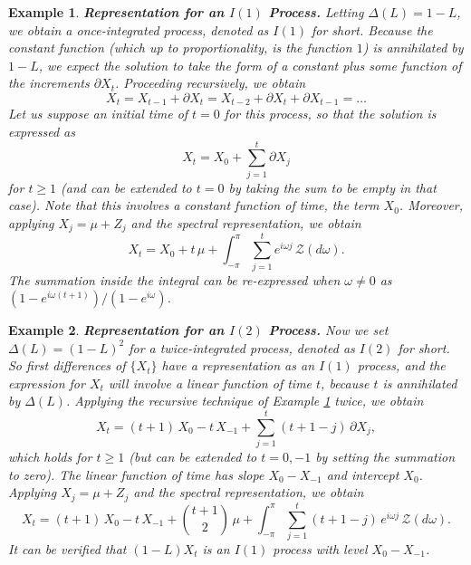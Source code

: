 \documentclass[a4paper]{book}
\newtheorem{Example}{Example}
\begin{document}
 \begin{Example} {\bf Representation for an $I(1)$ Process.}  \rm
 \label{exam:I1-rep}
    Letting $\Delta (L)= 1-L$, we obtain a once-integrated process,
  denoted as $I(1)$ for short.    
  Because  the constant function (which up to proportionality, is the function $1$)
  is annihilated by $1-L$, we expect the solution to take the form
   of a constant plus some function of the increments $\partial X_t$.
   Proceeding recursively, we obtain
\[
  X_t =    X_{t-1} + \partial X_t = X_{t-2} + \partial X_t + \partial X_{t-1} = \ldots
\]
    Let us suppose an initial time of $t=0$ for this process, so that the
      solution is expressed as 
\[
 X_t = X_0 + \sum_{j=1}^t \partial X_j
\]
    for $t \geq 1$ (and can be extended to $t=0$ by taking the sum to be empty in that case).
  Note that this involves a constant function of time,
  the term $X_0$.  Moreover, applying $X_j = \mu + Z_j$ and the spectral representation,
  we obtain
\begin{equation*}
 X_t = X_0 + t \, \mu +   \int_{-\pi}^{\pi} \sum_{j=1}^t e^{i \omega j}
   \, \mathcal{Z} (d\omega).  
\end{equation*}
  The summation inside the integral can be re-expressed when $\omega \neq 0$ as
  $(1 - e^{i \omega (t+1)})/(1-e^{i \omega})$.
\end{Example}   


\begin{Example} {\bf Representation for an $I(2)$ Process.} \rm
\label{exam:i2-rep}
  Now we set  $\Delta (L)= {(1-L)}^2$  for a twice-integrated process,
  denoted as $I(2)$ for short.    So first differences of $\{ X_t \}$ 
  have a representation as an $I(1)$ process, and the expression for
   $X_t$ will involve a linear function of time $t$, because $t$ is
  annihilated by $\Delta (L)$.  Applying the recursive technique of 
  Example \ref{exam:I1-rep} twice, we obtain
 \[
 X_t = (t+1) \, X_0 - t \, X_{-1}  + \sum_{j=1}^t (t+1-j) \, \partial X_j,
\]
 which holds for $t \geq 1$  (but can be extended to $t=0,-1$ by setting
  the summation to zero).  The linear function of time has slope
  $X_0 - X_{-1}$ and intercept $X_0$.
 Applying $X_j = \mu + Z_j$ and the spectral representation,
  we obtain
\begin{equation*}
 X_t =(t+1) \, X_0 - t \, X_{-1}  + \binom{t+1}{2} \, \mu
 +  \int_{-\pi}^{\pi} \sum_{j=1}^t (t+1-j) \, e^{i \omega j}
   \, \mathcal{Z} (d\omega).  
\end{equation*}
 It can be verified that $(1-L) X_t$ is an $I(1)$ process with level
 $X_0 - X_{-1}$.
\end{Example}
\end{document}

